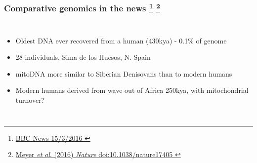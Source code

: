 
%
\begin{frame}
  \frametitle{Comparative genomics in the news
                   \footnote{\tiny{\href{http://www.bbc.co.uk/news/science-environment-35806992}{BBC News 15/3/2016
}}}
                   \footnote{\tiny{\href{http://dx.doi.org/10.1038/nature17405
}{Meyer \textit{et al}. (2016) \textit{Nature} doi:10.1038/nature17405
}}}
}
    \begin{columns}[c] 
        \begin{itemize}
          \item \textcolor{RawSienna}{Oldest DNA ever recovered from a human (430kya) - 0.1\% of genome}
          \item \textcolor{hutton_blue}{28 individuals, Sima de los Huesos, N. Spain}
          \item \textcolor{hutton_purple}{mitoDNA more similar to Siberian Denisovans than to modern humans}
          \item \textcolor{hutton_green}{Modern humans derived from wave out of Africa 250kya, with mitochondrial turnover?}
        \end{itemize}

\end{columns}
\end{frame}

